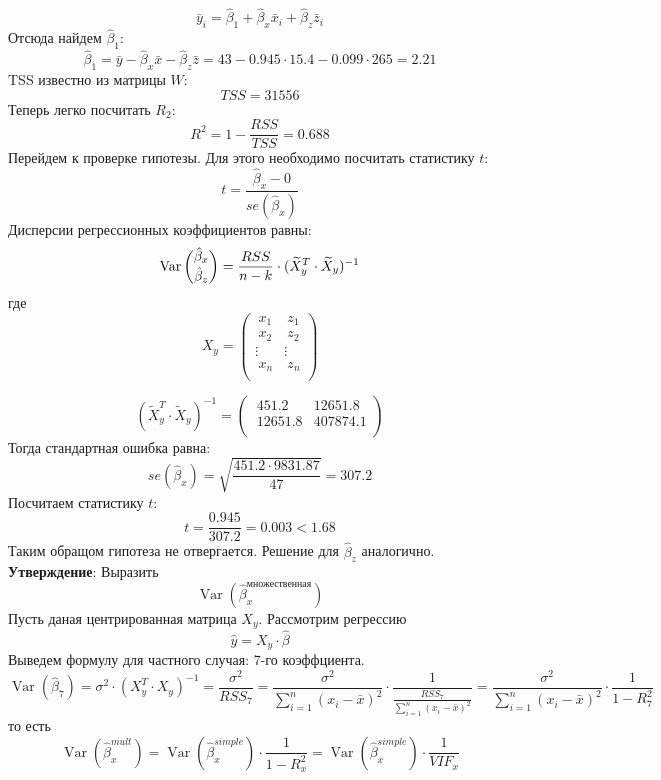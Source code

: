 \documentclass[12pt]{article} %
\theoremstyle{definition} %
\DeclareMathOperator{\Var}{Var}
\begin{document}
\[\bar{y}_i=\hat{\beta}_1+\hat{\beta}_x\bar{x}_i+\hat{\beta}_z\bar{z}_i\]
Отсюда найдем $\hat{\beta}_1$:
\[\hat{\beta}_1 = \bar{y} - \hat{\beta}_x\bar{x} - \hat{\beta}_z\bar{z} = 43 - 0.945\cdot15.4 - 0.099\cdot265 = 2.21\]    
TSS известно из матрицы $W$:
\[TSS = 31556\]
Теперь легко посчитать $R_2$:
\[R^2 = 1 - \dfrac{RSS}{TSS} = 0.688\]
Перейдем к проверке гипотезы. Для этого необходимо посчитать статистику $t$:
\[t = \dfrac{\hat{\beta}_x - 0}{se(\hat{\beta}_x)}\]
Дисперсии регрессионных коэффициентов равны:
\[\Var \dbinom{\hat{\beta}_x}{\hat{\beta}_z} = \dfrac{RSS}{n-k}\cdot{(\widetilde{X}^{T}_y \cdot \widetilde{X}_y)^{-1}}
\]
где \[
 X_y = \begin{pmatrix}
           \ x_{1} &\ z_{1}\\
           \ x_{2} &\ z_{2}\\
           \vdots & \vdots\\
           \ x_{n} &\ z_{n}\\
         \end{pmatrix}
         \]
         
\[(\widetilde{X}^{T}_y \cdot \widetilde{X}_y)^{-1} = \begin{pmatrix}
            \ 451.2 & 12651.8\\
            \ 12651.8 & 407874.1\\
        \end{pmatrix}
\]
Тогда стандартная ошибка равна:
\[se(\hat{\beta}_x) = \sqrt{\dfrac{451.2\cdot9831.87}{47}} = 307.2\]
Посчитаем статистику $t$:
\[t = \dfrac{0.945}{307.2} = 0.003 < 1.68\]
Таким обращом гипотеза не отвергается. Решение для $\hat{\beta}_z$ аналогично.\\

\textbf{Утверждение}: Выразить \[\Var(\hat{\beta}_x^{множественная})\] 
Пусть даная центрированная матрица $X_y$. Рассмотрим регрессию
\[\hat{y} = X_y\cdot{\hat\beta}\]
Выведем формулу для частного случая: 7-го коэффциента.
\[ \Var(\hat{\beta}_7) = \sigma^2\cdot(X^{T}_y \cdot X_y)^{-1} = \dfrac{\sigma^2}{RSS_7} = \dfrac{\sigma^2}{\sum\limits_{i=1}^n(x_i - \bar{x})^2}\cdot\dfrac{1}{\frac{RSS_7}{\sum\limits_{i=1}^n(x_i - \bar{x})^2}} = \dfrac{\sigma^2}{\sum\limits_{i=1}^n(x_i - \bar{x})^2}\cdot\dfrac{1}{1-R^2_7}\]
то есть
\[\Var(\hat{\beta}_x^{mult}) =  \Var(\hat{\beta}_x^{simple})\cdot\dfrac{1}{1 - R_x^2} = \Var(\hat{\beta}_x^{simple})\cdot\dfrac{1}{VIF_x}\]
\end{document}
